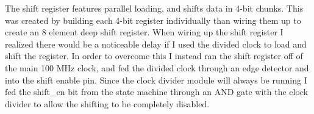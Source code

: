 \documentclass[11pt]{article}
\begin{document}
The shift register features parallel loading, and shifts data in 4-bit chunks. This was created by building each 4-bit register individually than wiring them up to create an 8 element deep shift register. When wiring up the shift register I realized there would be a noticeable delay if I used the divided clock to load and shift the register. In order to overcome this I instead ran the shift register off of the main 100 MHz clock, and fed the divided clock through an edge detector and into the shift enable pin. Since the clock divider module will always be running I fed the shift\_en bit from the state machine through an AND gate with the clock divider to allow the shifting to be completely disabled.
\end{document}
